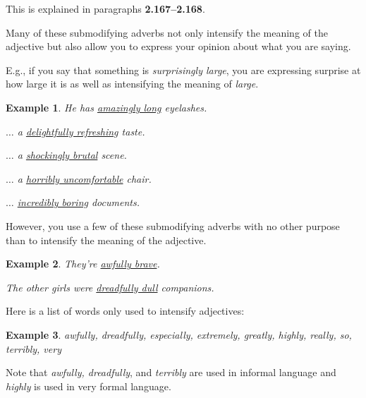 \documentclass[oneside]{book}
\numberwithin{equation}{section}
\newtheorem{example}{Example}[section]
\begin{document}
This is explained in paragraphs \textbf{2.167--2.168}.

%
\noindent{} Many of these submodifying adverbs not only intensify the meaning of the adjective but also allow you to express your opinion about what you are saying.

E.g., if you say that something is \textit{surprisingly large}, you are expressing surprise at how large it is as well as intensifying the meaning of \textit{large}.
\begin{example}
    He has \underline{amazingly long} eyelashes.
    
    $\ldots$ a \underline{delightfully refreshing} taste.
    
    $\ldots$ a \underline{shockingly brutal} scene.
    
    $\ldots$ a \underline{horribly uncomfortable} chair.
    
    $\ldots$ \underline{incredibly boring} documents.
\end{example}
However, you use a few of these submodifying adverbs with no other purpose than to intensify the meaning of the adjective.
\begin{example}
    They're \underline{awfully brave}.
    
    The other girls were \underline{dreadfully dull} companions.
\end{example}
Here is a list of words only used to intensify adjectives:
\begin{example}
    awfully, dreadfully, especially, extremely, greatly, highly, really, so, terribly, very
\end{example}
Note that \textit{awfully, dreadfully}, and \textit{terribly} are used in informal language and \textit{highly} is used in very formal language.
\end{document}
